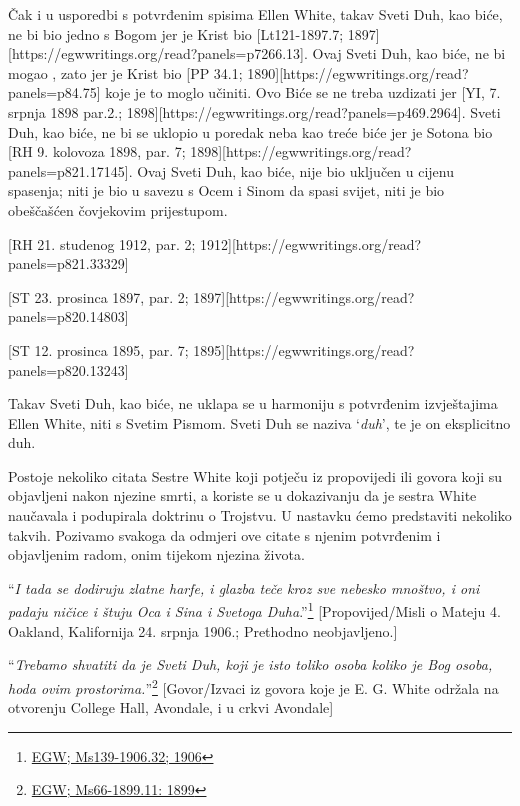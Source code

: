 Čak i u usporedbi s potvrđenim spisima Ellen White, takav Sveti Duh, kao biće, ne bi bio jedno s Bogom jer je Krist bio [Lt121-1897.7; 1897][https://egwwritings.org/read?panels=p7266.13]. Ovaj Sveti Duh, kao biće, ne bi mogao , zato jer je Krist bio [PP 34.1; 1890][https://egwwritings.org/read?panels=p84.75] koje je to moglo učiniti. Ovo Biće se ne treba uzdizati jer [YI, 7. srpnja 1898 par.2.; 1898][https://egwwritings.org/read?panels=p469.2964]. Sveti Duh, kao biće, ne bi se uklopio u poredak neba kao treće biće jer je Sotona bio [RH 9. kolovoza 1898, par. 7; 1898][https://egwwritings.org/read?panels=p821.17145]. Ovaj Sveti Duh, kao biće, nije bio uključen u cijenu spasenja; niti je bio u savezu s Ocem i Sinom da spasi svijet, niti je bio obeščašćen čovjekovim prijestupom.

[RH 21. studenog 1912, par. 2; 1912][https://egwwritings.org/read?panels=p821.33329]

[ST 23. prosinca 1897, par. 2; 1897][https://egwwritings.org/read?panels=p820.14803]

[ST 12. prosinca 1895, par. 7; 1895][https://egwwritings.org/read?panels=p820.13243]

Takav Sveti Duh, kao biće, ne uklapa se u harmoniju s potvrđenim izvještajima Ellen White, niti s Svetim Pismom. Sveti Duh se naziva ‘\textit{duh}’, te je on eksplicitno duh.

Postoje nekoliko citata Sestre White koji potječu iz propovijedi ili govora koji su objavljeni nakon njezine smrti, a koriste se u dokazivanju da je sestra White naučavala i podupirala doktrinu o Trojstvu. U nastavku ćemo predstaviti nekoliko takvih. Pozivamo svakoga da odmjeri ove citate s njenim potvrđenim i objavljenim radom, onim tijekom njezina života.

“\textit{I tada se dodiruju zlatne harfe, i glazba teče kroz sve nebesko mnoštvo, i oni padaju ničice i štuju Oca i Sina i Svetoga Duha}.”\footnote{\href{https://egwwritings.org/?ref=en_Ms139-1906.32&para=9579.38}{EGW; Ms139-1906.32; 1906}} [Propovijed/Misli o Mateju 4. Oakland, Kalifornija 24. srpnja 1906.; Prethodno neobjavljeno.]

“\textit{Trebamo shvatiti da je Sveti Duh, koji je isto toliko osoba koliko je Bog osoba, hoda ovim prostorima.}”\footnote{\href{https://egwwritings.org/?ref=en_Ms66-1899.11&para=6622.19}{EGW; Ms66-1899.11: 1899}} [Govor/Izvaci iz govora koje je E. G. White održala na otvorenju College Hall, Avondale, i u crkvi Avondale]
